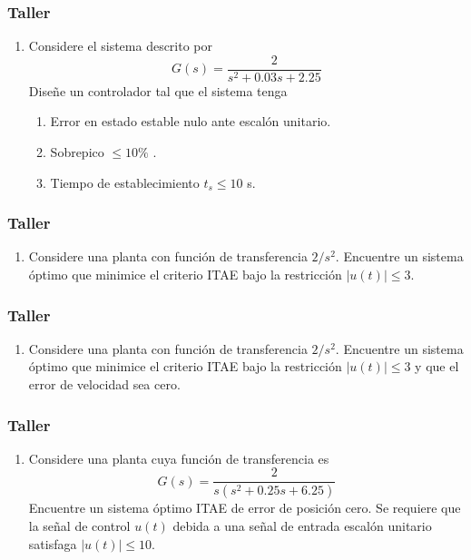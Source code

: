 \documentclass[aspectratio=169]{beamer}
\theoremstyle{definition}
\theoremstyle{plain}
\theoremstyle{remark}
\newcounter{saveenumi}
\newcommand{\seti}{\setcounter{saveenumi}{\value{enumi}}}
\newcommand{\conti}{\setcounter{enumi}{\value{saveenumi}}}
\begin{document}
\begin{frame}[c]\frametitle{Taller}
\begin{enumerate}
	\conti
	\item Considere el sistema descrito por
		\begin{equation*}
			G(s) = \frac{2}{s^2 + 0.03s + 2.25}
		\end{equation*}
		Diseñe un controlador tal que el sistema tenga
		\begin{enumerate}
			\item Error en estado estable nulo ante escalón unitario.
			\item Sobrepico $\leq 10\%$ .
			\item Tiempo de establecimiento $t_s \leq 10$ s.
		\end{enumerate}
	\seti 
\end{enumerate}
\end{frame}

\begin{frame}[c]\frametitle{Taller}
\begin{enumerate}
	\conti
	\item Considere una planta con función de transferencia $2/s^2$. Encuentre un sistema óptimo que minimice el criterio ITAE bajo la restricción $|u(t)| \leq 3$.
	\seti
\end{enumerate}
\end{frame}

\begin{frame}[c]\frametitle{Taller}
\begin{enumerate}
	\conti
	\item Considere una planta con función de transferencia $2/s^2$. Encuentre un sistema óptimo que minimice el criterio ITAE bajo la restricción $|u(t)| \leq 3$ y que el error de velocidad sea cero.
	\seti
\end{enumerate}
\end{frame}

\begin{frame}[c]\frametitle{Taller}
\begin{enumerate}
	\conti
	\item Considere una planta cuya función de transferencia es
		\begin{equation*}
			G(s) = \frac{2}{s(s^2 + 0.25s + 6.25)}
		\end{equation*}
		Encuentre un sistema óptimo ITAE de error de posición cero. Se requiere que la señal de control $u(t)$ debida a una señal de entrada escalón unitario satisfaga $|u(t)| \leq 10$.
	\seti
\end{enumerate}
\end{frame}
\end{document}
